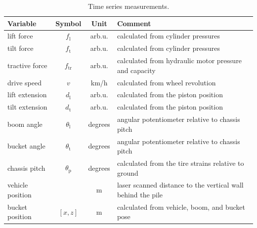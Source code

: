 \documentclass[10pt]{article}
\begin{document}
\begin{table}[ht] 
  \caption{Time series measurements.}
  \centering
  \begin{tabular}{|l|c|c|l|}%
  \hline
  Variable          & 	Symbol  &  Unit  & Comment \\ 
  \hline
  lift force & $f_\mathrm{l}$     &  arb.u.   &  calculated from cylinder pressures \\
  tilt force & $f_\mathrm{t}$     &  arb.u.   &  calculated from cylinder pressures \\
  tractive force    &   $f_\mathrm{tr}$  &  arb.u. & calculated from hydraulic motor pressure and capacity \\
  drive speed    &   $v$  &  km/h & calculated from wheel revolution \\ 
  lift extension & $d_\mathrm{l}$     &  arb.u.   &  calculated from the piston position \\
  tilt extension & $d_\mathrm{t}$     &  arb.u.   &  calculated from the piston position \\
  boom angle    &   $\theta_\mathrm{l}$  &  degrees & angular potentiometer relative to chassis pitch \\ 
  bucket angle    &   $\theta_\mathrm{t}$  &  degrees & angular potentiometer relative to chassis pitch \\ 
  chassis pitch  &   $\theta_\mathrm{p}$  &  degrees & calculated from the tire strains relative to ground \\  
  vehicle position  &    &  m & laser scanned distance  to the vertical wall behind the pile \\    
														  
  bucket position &   $[x,z]$  &  m & calculated from  vehicle, boom, and bucket pose \\    \hline
\end{tabular}
\label{table:time_series}
\end{table}   
\end{document}

